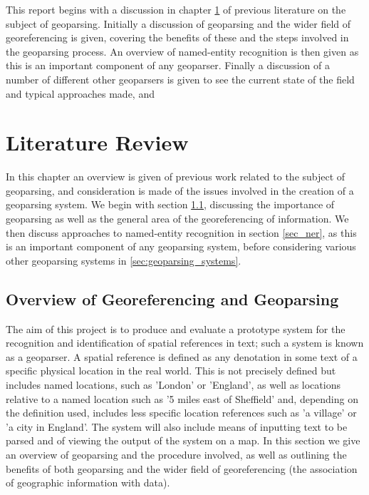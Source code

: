 \documentclass[12pt, a4paper]{report}
\begin{document}
This report begins with a discussion in chapter \ref{chap:lit_review} of previous literature on the subject of geoparsing. Initially a discussion of geoparsing and the wider field of georeferencing is given, covering the benefits of these and the steps involved in the geoparsing process. An overview of named-entity recognition is then given as this is an important component of any geoparser. Finally a discussion of a number of different other geoparsers is given to see the current state of the field and typical approaches made, and 






\chapter{Literature Review}
\label{chap:lit_review}

In this chapter an overview is given of previous work related to the subject of geoparsing, and consideration is made of the issues involved in the creation of a geoparsing system. We begin with section \ref{sec:overview_georeferencing}, discussing the importance of geoparsing as well as the general area of the georeferencing of information. We then discuss approaches to named-entity recognition in section \ref{sec_ner}, as this is an important component of any geoparsing system, before considering various other geoparsing systems in \ref{sec:geoparsing_systems}.


\section{Overview of Georeferencing and Geoparsing}
\label{sec:overview_georeferencing}

The aim of this project is to produce and evaluate a prototype system for the recognition and identification of spatial references in text; such a system is known as a geoparser. A spatial reference is defined as any denotation in some text of a specific physical location in the real world. This is not precisely defined but includes named locations, such as 'London' or 'England', as well as locations relative to a named location such as '5 miles east of Sheffield' and, depending on the definition used, includes less specific location references such as 'a village' or 'a city in England'. The system will also include means of inputting text to be parsed and of viewing the output of the system on a map. In this section we give an overview of geoparsing and the procedure involved, as well as outlining the benefits of both geoparsing and the wider field of georeferencing (the association of geographic information with data). 
\end{document}
